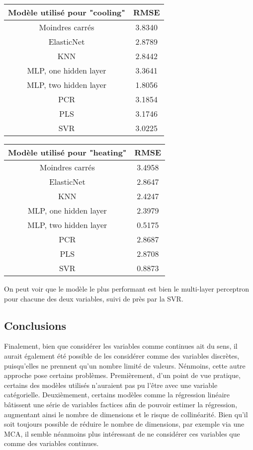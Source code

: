 \documentclass[11pt,a4paper]{article}
\begin{document}
\begin{center}
\begin{tabular}{|c|c|}
\hline 
Modèle utilisé pour "cooling" & RMSE  \\ 
\hline 
Moindres carrés & 3.8340 \\ 
\hline 
ElasticNet & 2.8789 \\ 
\hline 
KNN & 2.8442 \\ 
\hline 
MLP, one hidden layer & 3.3641 \\ 
\hline 
MLP, two hidden layer & 1.8056 \\ 
\hline 
PCR  & 3.1854 \\ 
\hline 
PLS  & 3.1746 \\ 
\hline
SVR  & 3.0225 \\ 
\hline 
\end{tabular} 
\bigskip

\begin{tabular}{|c|c|}
\hline 
Modèle utilisé pour "heating" & RMSE  \\ 
\hline 
Moindres carrés  & 3.4958 \\ 
\hline 
ElasticNet & 2.8647 \\ 
\hline 
KNN  & 2.4247 \\ 
\hline 
MLP, one hidden layer & 2.3979  \\ 
\hline 
MLP, two hidden layer  & 0.5175 \\ 
\hline 
PCR   & 2.8687 \\ 
\hline 
PLS  & 2.8708 \\ 
\hline
SVR  & 0.8873 \\ 
\hline 
\end{tabular} \bigskip
\end{center}

On peut voir que le modèle le plus performant est bien le multi-layer perceptron pour chacune des deux variables, suivi de près par la SVR. 


\subsection{Conclusions}

Finalement, bien que considérer les variables comme continues ait du sens, il aurait également été possible de les considérer comme des variables discrètes, puisqu'elles ne prennent qu'un nombre limité de valeurs. Nénmoins, cette autre approche pose certains problèmes. Premièrement, d'un point de vue pratique, certains des modèles utilisés n'auraient pas pu l'être avec une variable catégorielle. Deuxièmement, certains modèles comme la régression linéaire bâtissent une série de variables factices afin de pouvoir estimer la régression, augmentant ainsi le nombre de dimensions et le risque de collinéarité. Bien qu'il soit toujours possible de réduire le nombre de dimensions, par exemple via une MCA, il semble néanmoins plus intéressant de ne considérer ces variables que comme des variables continues.
\end{document}
